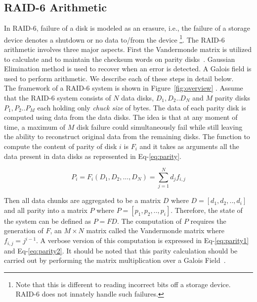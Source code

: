 \subsection{RAID-6 Arithmetic}
\label{raid_arithmetic}
In RAID-6, failure of a disk is modeled as an erasure, i.e., the failure of a storage device denotes a shutdown or no data to/from the device \footnote{Note that this is different to reading incorrect bits off a storage device. RAID-6 does not innately handle such failures.}.
The RAID-6 arithmetic involves three major aspects.
First the Vandermonde matrix is utilized to calculate and to maintain the checksum words on parity disks~\cite{raid6_2011}.
Gaussian Elimination method is used to recover when an error is detected.
A Galois field is used to perform arithmetic.
We describe each of these steps in detail below. 
\\[1pt]

  The framework of a RAID-6 system is shown in Figure~\ref{fig:overview} . Assume that the RAID-6 system consists of $N$ data disks, $D_{1}, D_{2}.. D_{N}$ and $M$ parity disks $P_{1}, P_{2}.. P_{M}$ each holding only \textit{chuck size} of bytes.
The data of each parity disk is computed using data from the data disks.
The idea is that at any moment of time, a maximum of $M$ disk failure could simultaneously fail while still leaving the ability to reconstruct original data from the remaining disks.
The function to compute the content of parity of disk $i$ is $F_i$ and it takes as arguments all the data present in data disks as represented in Eq-\ref{eq:parity}.

\begin{equation}
\label{eq:parity}
P_i = F_i(D_1,D_2,...,D_N) = \sum_{j=1}^{N}d_j f_{i,j}
\end{equation}

Then all data chunks are aggregated to be a matrix $D$ where $D = [d_1, d_2,..,d_i]$ and all parity into a matrix $P$ where $P = [p_1, p_2,..,p_i]$.
Therefore, the state of the system can be defined as $P = FD$.
The computation of $P$ requires the generation of $F$, an $M \times N$ matrix called the Vandermonde matrix where $f_{i,j}=j^{i-1}$.
A verbose version of this computation is expressed in Eq-\ref{eq:parity1} and Eq-\ref{eq:parity2}.
It should be noted that this parity calculation should be carried out by performing the matrix multiplication over a Galois Field~\cite{matrix_1991}.

